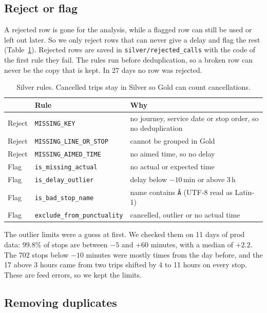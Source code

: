 \documentclass[11pt,a4paper]{article}
\newcommand{\rowline}{\arrayrulecolor{black!25}\midrule\arrayrulecolor{black}}
\newcommand{\code}[1]{\texttt{#1}}
\begin{document}
\subsection*{Reject or flag}

A rejected row is gone for the analysis, while a flagged row can still be used or left out
later. So we only reject rows that can never give a delay and flag the rest
(Table~\ref{tab:rules}). Rejected rows are saved in \code{silver/rejected\_calls} with the code
of the first rule they fail. The rules run before deduplication, so a broken row can never be
the copy that is kept. In 27 days no row was rejected.

\begin{table}[htb]
\centering\small
\renewcommand{\arraystretch}{1.2}
\begin{tabularx}{\linewidth}{@{}ll>{\raggedright\arraybackslash}X@{}}
\toprule
& Rule & Why \\
\midrule
Reject & \code{MISSING\_KEY} & no journey, service date or stop order, so no deduplication \\
Reject & \code{MISSING\_LINE\_OR\_STOP} & cannot be grouped in Gold \\
Reject & \code{MISSING\_AIMED\_TIME} & no aimed time, so no delay \\ \rowline
Flag & \code{is\_missing\_actual} & no actual or expected time \\
Flag & \code{is\_delay\_outlier} & delay below $-10$\,min or above 3\,h \\
Flag & \code{is\_bad\_stop\_name} & name contains \code{Ã} (UTF-8 read as Latin-1) \\
Flag & \code{exclude\_from\_punctuality} & cancelled, outlier or no actual time \\
\bottomrule
\end{tabularx}
\caption{Silver rules. Cancelled trips stay in Silver so Gold can count cancellations.}
\label{tab:rules}
\end{table}

The outlier limits were a guess at first. We checked them on 11 days of prod data: 99.8\% of
stops are between $-5$ and $+60$ minutes, with a median of $+2.2$. The 702 stops below
$-10$ minutes were mostly times from the day before, and the 17 above 3 hours came from two
trips shifted by 4 to 11 hours on every stop. These are feed errors, so we kept the limits.

\subsection*{Removing duplicates}
\end{document}
